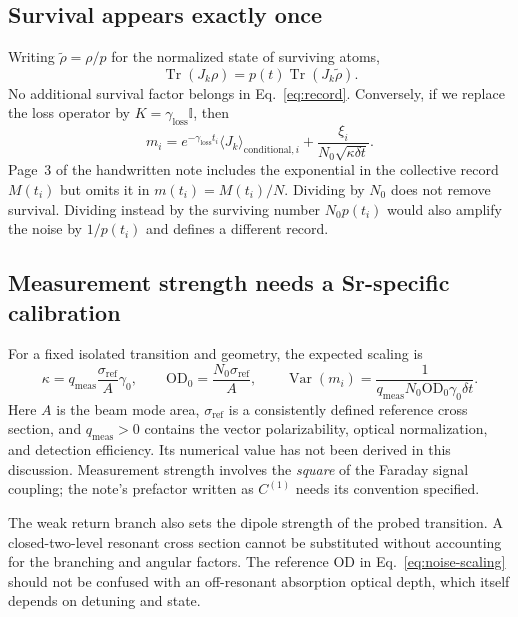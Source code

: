 \documentclass[11pt,letterpaper]{article}
\newcommand{\Tr}{\operatorname{Tr}}
\newcommand{\id}{\mathbb{I}}
\newcommand{\OD}{\mathrm{OD}}
\newcommand{\dt}{\delta t}
\newcommand{\Jk}{J_k}
\begin{document}
\subsection*{Survival appears exactly once}
Writing $\widetilde\rho=\rho/p$ for the normalized state of surviving atoms,
\begin{equation}
\Tr(\Jk\rho)=p(t)\Tr(\Jk\widetilde\rho).
\end{equation}
No additional survival factor belongs in Eq.~\eqref{eq:record}. Conversely,
if we replace the loss operator by $K=\gamma_{\mathrm{loss}}\id$, then
\begin{equation}
m_i=e^{-\gamma_{\mathrm{loss}}t_i}
\langle\Jk\rangle_{\mathrm{conditional},i}
+\frac{\xi_i}{N_0\sqrt{\kappa\dt}}.
\label{eq:uniform-record}
\end{equation}
Page~3 of the handwritten note includes the exponential in the collective
record $M(t_i)$ but omits it in $m(t_i)=M(t_i)/N$. Dividing by $N_0$ does not
remove survival. Dividing instead by the surviving number $N_0p(t_i)$ would
also amplify the noise by $1/p(t_i)$ and defines a different record.

\subsection*{Measurement strength needs a Sr-specific calibration}
For a fixed isolated transition and geometry, the expected scaling is
\begin{equation}
\kappa=q_{\mathrm{meas}}\frac{\sigma_{\mathrm{ref}}}{A}\gamma_0,
\qquad
\OD_0=\frac{N_0\sigma_{\mathrm{ref}}}{A},
\qquad
\operatorname{Var}(m_i)=
\frac{1}{q_{\mathrm{meas}}N_0\OD_0\gamma_0\dt}.
\label{eq:noise-scaling}
\end{equation}
Here $A$ is the beam mode area, $\sigma_{\mathrm{ref}}$ is a consistently
defined reference cross section, and $q_{\mathrm{meas}}>0$ contains the vector
polarizability, optical normalization, and detection efficiency. Its numerical
value has not been derived in this discussion. Measurement strength involves
the \emph{square} of the Faraday signal coupling; the note's prefactor written
as $C^{(1)}$ needs its convention specified.

The weak return branch also sets the dipole strength of the probed transition.
A closed-two-level resonant cross section cannot be substituted without
accounting for the branching and angular factors. The reference OD in
Eq.~\eqref{eq:noise-scaling} should not be confused with an off-resonant
absorption optical depth, which itself depends on detuning and state.
\end{document}
